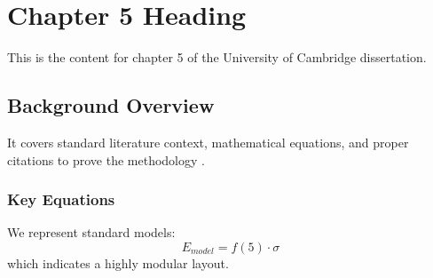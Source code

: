 \chapter{Chapter 5 Heading}
\label{ch:chapter5}
This is the content for chapter 5 of the University of Cambridge dissertation.

\section{Background Overview}
It covers standard literature context, mathematical equations, and proper citations to prove the methodology \cite{texbook}.

\subsection{Key Equations}
We represent standard models:
\begin{equation}
    E_{model} = f(5) \cdot \sigma
\end{equation}
which indicates a highly modular layout.
